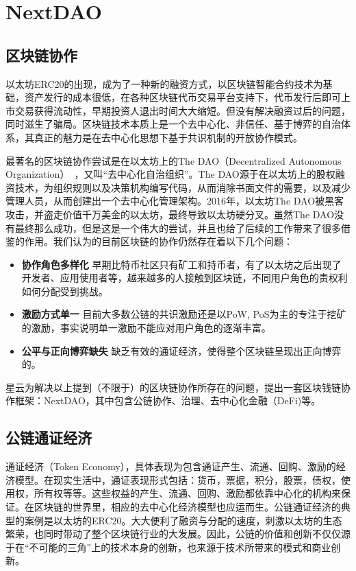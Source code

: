 \section{NextDAO}
\subsection{区块链协作}
以太坊ERC20的出现，成为了一种新的融资方式，以区块链智能合约技术为基础，资产发行的成本很低，在各种区块链代币交易平台支持下，代币发行后即可上市交易获得流动性，早期投资人退出时间大大缩短。但没有解决融资过后的问题，同时滋生了骗局。区块链技术本质上是一个去中心化、非信任、基于博弈的自治体系，其真正的魅力是在去中心化思想下基于共识机制的开放协作模式。

最著名的区块链协作尝试是在以太坊上的The DAO（Decentralized Autonomous Organization）~\cite{DAO}，又叫“去中心化自治组织”。The DAO源于在以太坊上的股权融资技术，为组织规则以及决策机构编写代码，从而消除书面文件的需要，以及减少管理人员，从而创建出一个去中心化管理架构。2016年，以太坊The DAO被黑客攻击，并盗走价值千万美金的以太坊，最终导致以太坊硬分叉。虽然The DAO没有最终那么成功，但是这是一个伟大的尝试，并且也给了后续的工作带来了很多借鉴的作用。我们认为的目前区块链的协作仍然存在着以下几个问题：

\begin{itemize}
	\item \textbf{协作角色多样化}
	早期比特币社区只有矿工和持币者，有了以太坊之后出现了开发者、应用使用者等，越来越多的人接触到区块链，不同用户角色的责权利如何分配受到挑战。
	\item \textbf{激励方式单一}
	目前大多数公链的共识激励还是以PoW, PoS为主的专注于挖矿的激励，事实说明单一激励不能应对用户角色的逐渐丰富。
	\item \textbf{公平与正向博弈缺失}
	缺乏有效的通证经济，使得整个区块链呈现出正向博弈的。
\end{itemize}

星云为解决以上提到（不限于）的区块链协作所存在的问题，提出一套区块钱链协作框架：NextDAO，其中包含公链协作、治理、去中心化金融（DeFi)等。

\subsection{公链通证经济}
通证经济（Token Economy），具体表现为包含通证产生、流通、回购、激励的经济模型。在现实生活中，通证表现形式包括：货币，票据，积分，股票，债权，使用权，所有权等等。这些权益的产生、流通、回购、激励都依靠中心化的机构来保证。在区块链的世界里，相应的去中心化经济模型也应运而生。公链通证经济的典型的案例是以太坊的ERC20。大大便利了融资与分配的速度，刺激以太坊的生态繁荣，也同时带动了整个区块链行业的大发展。因此，公链的价值和创新不仅仅源于在“不可能的三角”上的技术本身的创新，也来源于技术所带来的模式和商业创新。


